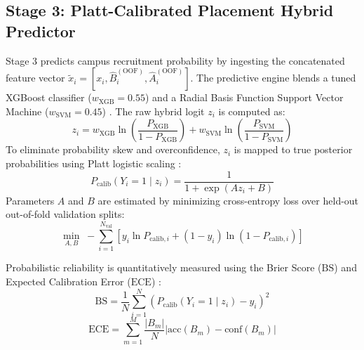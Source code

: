 \documentclass[conference]{IEEEtran}
\begin{document}
\subsection{Stage 3: Platt-Calibrated Placement Hybrid Predictor}
Stage 3 predicts campus recruitment probability by ingesting the concatenated feature vector $\tilde{x}_i = [x_i, \hat{B}_i^{(\text{OOF})}, \hat{A}_i^{(\text{OOF})}]$. The predictive engine blends a tuned XGBoost classifier ($w_{\text{XGB}}=0.55$) and a Radial Basis Function Support Vector Machine ($w_{\text{SVM}}=0.45$) \cite{cortes1995}. The raw hybrid logit $z_i$ is computed as:
\begin{equation}
z_i = w_{\text{XGB}} \ln \left( \frac{P_{\text{XGB}}}{1 - P_{\text{XGB}}} \right) + w_{\text{SVM}} \ln \left( \frac{P_{\text{SVM}}}{1 - P_{\text{SVM}}} \right)
\label{eq:hybrid_logits}
\end{equation}
To eliminate probability skew and overconfidence, $z_i$ is mapped to true posterior probabilities using Platt logistic scaling \cite{platt1999}:
\begin{equation}
P_{\text{calib}}(Y_i=1 \mid z_i) = \frac{1}{1 + \exp(A z_i + B)}
\label{eq:platt}
\end{equation}
Parameters $A$ and $B$ are estimated by minimizing cross-entropy loss over held-out out-of-fold validation splits:
\begin{equation}
\min_{A, B} \; -\sum_{i=1}^{N_{\text{val}}} \left[ y_i \ln P_{\text{calib}, i} + (1-y_i) \ln(1 - P_{\text{calib}, i}) \right]
\label{eq:platt_loss}
\end{equation}

Probabilistic reliability is quantitatively measured using the Brier Score ($\text{BS}$) \cite{niculescu2005} and Expected Calibration Error ($\text{ECE}$) \cite{guo2017}:
\begin{equation}
\text{BS} = \frac{1}{N} \sum_{i=1}^N \left( P_{\text{calib}}(Y_i=1 \mid z_i) - y_i \right)^2
\label{eq:brier}
\end{equation}
\begin{equation}
\text{ECE} = \sum_{m=1}^M \frac{|B_m|}{N} \left| \text{acc}(B_m) - \text{conf}(B_m) \right|
\label{eq:ece}
\end{equation}
\end{document}
